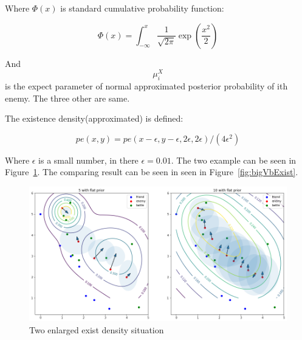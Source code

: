 \documentclass{article}
\begin{document}
Where $\Phi(x)$ is standard cumulative probability function:

$$
\Phi(x) = \int_{-\infty}^x \frac{1}{\sqrt{2\pi}} \exp\left(\frac{x^2}{2}\right)
$$

And $$\mu^X_i$$ is the expect parameter of normal approximated posterior probability of ith enemy.
The three other are same.

The existence density(approximated) is defined:

$$
pe(x,y) = pe(x-\epsilon,y-\epsilon,2\epsilon,2\epsilon)/(4 \epsilon^2)
$$

Where $\epsilon$ is a small number, in there $\epsilon=0.01$. 
The two example can be seen in Figure~\ref{fig:existDensity}. 
The comparing result can be seen in seen in Figure~\ref{fig:bigVbExist}.

\begin{figure}[h]
\includegraphics[width=0.99\linewidth]{exist_density.png}
\caption{Two enlarged exist density situation}
\label{fig:existDensity}
\end{figure}
\end{document}
